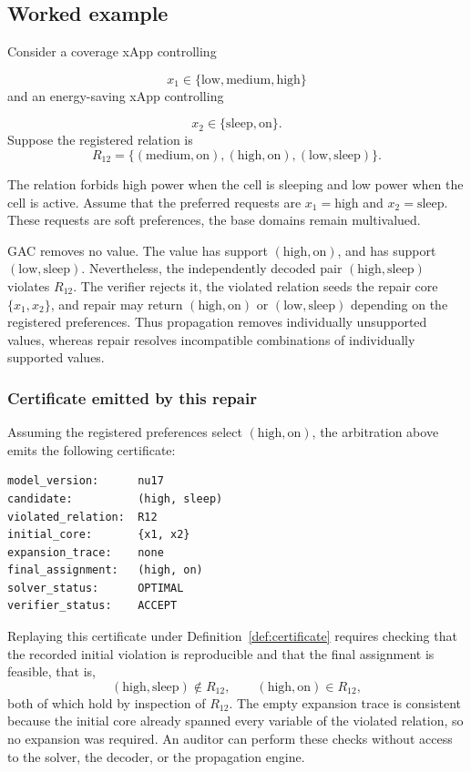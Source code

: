 \documentclass[pdflatex,sn-mathphys-num,iicol,oneside]{sn-jnl}
\newcommand{\gac}{\textsc{GAC}\xspace}
\begin{document}
\subsection{Worked example}
\label{sec:worked-example}

Consider a coverage xApp controlling

\[
x_1\in
\{
\text{low},
\text{medium},
\text{high}
\}
\]
and an energy-saving xApp controlling

\[
x_2\in
\{
\text{sleep},
\text{on}
\}.
\]
Suppose the registered relation is
\begin{equation}
R_{12}
=
\{
(\text{medium},\text{on}),
(\text{high},\text{on}),
(\text{low},\text{sleep})
\}.
\end{equation}

The relation forbids high power when the cell is sleeping and low
power when the cell is active. Assume that the preferred requests are
$x_1=\text{high}$ and $x_2=\text{sleep}$. These requests are soft
preferences, the base domains remain multivalued.

\gac removes no value. The value  has support
$(\text{high},\text{on})$, and  has support
$(\text{low},\text{sleep})$. Nevertheless, the independently decoded
pair
$(\text{high},\text{sleep})$ violates $R_{12}$. The verifier rejects
it, the violated relation seeds the repair core
$\{x_1,x_2\}$, and repair may return
$(\text{high},\text{on})$ or $(\text{low},\text{sleep})$ depending on
the registered preferences. Thus propagation removes individually
unsupported values, whereas repair resolves incompatible
combinations of individually supported values.

\subsubsection*{Certificate emitted by this repair}
\label{sec:certificate-example}

Assuming the registered preferences select $(\text{high},\text{on})$,
the arbitration above emits the following certificate:

\begin{verbatim}
model_version:      nu17
candidate:          (high, sleep)
violated_relation:  R12
initial_core:       {x1, x2}
expansion_trace:    none
final_assignment:   (high, on)
solver_status:      OPTIMAL
verifier_status:    ACCEPT
\end{verbatim}

Replaying this certificate under Definition~\ref{def:certificate}
requires checking that the recorded initial violation is reproducible
and that the final assignment is feasible, that is,
\begin{equation}
(\text{high},\text{sleep})\notin R_{12},
\qquad
(\text{high},\text{on})\in R_{12},
\end{equation}
both of which hold by inspection of $R_{12}$. The empty expansion
trace is consistent because the initial core already spanned every
variable of the violated relation, so no expansion was required. An
auditor can perform these checks without access to the solver, the
decoder, or the propagation engine.
\end{document}
